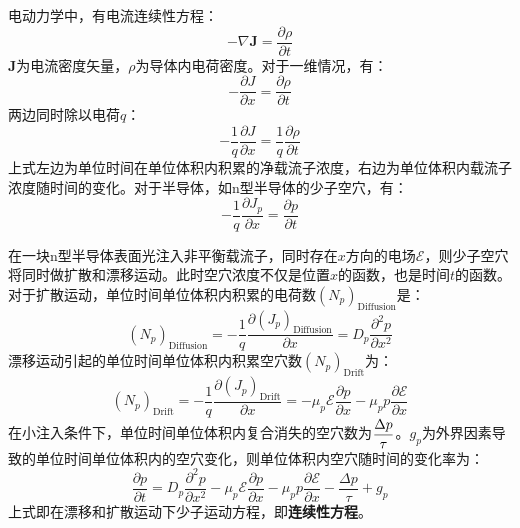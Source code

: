 电动力学中，有电流连续性方程：
\begin{equation}
    -\nabla \bm J=\frac{\partial \rho}{\partial t}
\end{equation}
$\bm J$为电流密度矢量，$\rho$为导体内电荷密度。对于一维情况，有：
\begin{equation}
    -\frac{\partial J}{\partial x}=\frac{\partial \rho}{\partial t}
\end{equation}
两边同时除以电荷$q$：
\begin{equation}
    -\frac{1}{q}\frac{\partial J}{\partial x}=\frac{1}{q}\frac{\partial \rho}{\partial t}
\end{equation}
上式左边为单位时间在单位体积内积累的净载流子浓度，右边为单位体积内载流子浓度随时间的变化。对于半导体，如n型半导体的少子空穴，有：
\begin{equation}
    -\frac{1}{q}\frac{\partial J_p}{\partial x}=\frac{\partial p}{\partial t}
\end{equation}

在一块n型半导体表面光注入非平衡载流子，同时存在$x$方向的电场$\mathscr{E}$，则少子空穴将同时做扩散和漂移运动。此时空穴浓度不仅是位置$x$的函数，也是时间$t$的函数。对于扩散运动，单位时间单位体积内积累的电荷数$(N_p)_\text{Diffusion}$是：
\begin{equation}
    (N_p)_\text{Diffusion}=-\frac{1}{q}\frac{\partial (J_p)_\text{Diffusion}}{\partial x}=D_p\frac{\partial^2 p}{\partial x^2}
\end{equation}
漂移运动引起的单位时间单位体积内积累空穴数$(N_p)_\text{Drift}$为：
\begin{equation}
    (N_p)_\text{Drift}=-\frac{1}{q}\frac{\partial (J_p)_\text{Drift}}{\partial x}=-\mu_p\mathscr{E}\frac{\partial p}{\partial x}-\mu_p p\frac{\partial \mathscr{E}}{\partial x}
\end{equation}
在小注入条件下，单位时间单位体积内复合消失的空穴数为$\displaystyle \frac{\Delta p}{\tau}$。$g_p$为外界因素导致的单位时间单位体积内的空穴变化，则单位体积内空穴随时间的变化率为：
\begin{equation}
    \frac{\partial p}{\partial t}=D_p\frac{\partial^2 p}{\partial x^2}-\mu_p\mathscr{E}\frac{\partial p}{\partial x}-\mu_p p\frac{\partial \mathscr{E}}{\partial x}-\frac{\Delta p}{\tau}+g_p
\end{equation}
上式即在漂移和扩散运动下少子运动方程，即\textbf{连续性方程}。\vspace{1ex}

